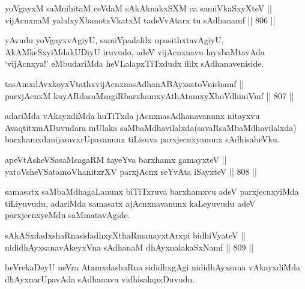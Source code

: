 \begin{shl}
yoVgayxM saMnihitaM ceVdaM sAkAknakxSXM ca samiVkaSxyXteV ||  \\
vijAcnxnaM yalalxyXbanotxVkatxM tadeVvAtarx tu sAdhanamf \hfill || 806 ||  
\end{shl}

\begin{artha}
yAvudu yoVgayxvAgiyU, samiVpadalilx upasithxtavAgiyU, AkAMkeSxyiMdakUDiyU iruvudo, adeV vijAcnxnavu layxbaMtavAda `vijAcnxya!' eMbudariMda heVLalapxTiTxdudx ililx sAdhanaveniside.
\end{artha}

\begin{shl}
tasAmxdAvxkoyxVtathxvijAcnxnasAdhanABAyxsatoV\s nishamf || \\
parxjAcnxM kuyARdasaMsagiRbarxhamxyAthAtamxyXboVdhiniVmf \hfill || 807 ||  
\end{shl}

\begin{artha}
adariMda vAkayxdiMda huTiTxda jAcnxnasAdhanavanunx nitayxvu AvaqtitxmADuvudara mUlaka saMbaMdhavilalxda(savaRsaMbaMdhavilalxda) barxhamxdanijasavxrUpavanunx tiLisuva parxjecnxyanunx sAdhisabeVku.
\end{artha}

\begin{shl}
apeVtAsheVSasaMsagaRM tayeYva barxhamx gamayxteV || \\
yatoV\s sheVSatamoVhanitxrXV parxjAcnx seYvAta iSayxteV \hfill || 808 ||  
\end{shl}

\begin{artha}
samasatx saMbaMdhagaLanunx biTiTxruva barxhamxvu adeV parxjecnxyiMda tiLiyuvudu, adariMda samasatx ajAcnxnavanunx kaLeyuvudu adeV parxjecnxyeMdu saMmatavAgide.
\end{artha}


\begin{shl}
sAkASxdadxshaRnasidadhxyXthaRmanayxtArxpi bidhiVyateV || \\
nididhAyxsanavAkeyxVna sAdhanaM dhAyxnalakaSxNamf \hfill || 809 ||  
\end{shl}

\begin{artha}
beVrekaDeyU neVra AtamxdashaRna sididhxgAgi nididhAyxsana vAkayxdiMda dhAyxnarUpavAda sAdhanavu vidhisalapxDuvudu.
\end{artha}

